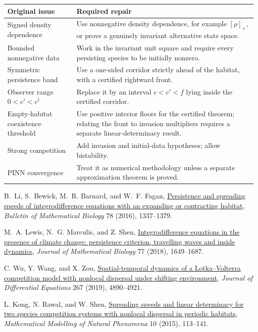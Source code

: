 \documentclass[11pt]{article}
\theoremstyle{definition}
\begin{document}
\begin{center}
\begin{tabularx}{0.92\textwidth}{@{}>{\raggedright\arraybackslash}p{}Y@{}}
\toprule
Original issue & Required repair\\
\midrule
Signed density dependence &
Use nonnegative density dependence, for example
\([\rho]_+\), or prove a genuinely invariant alternative state space.\\
Bounded nonnegative data &
Work in the invariant unit square and require every persisting species to be
initially nonzero.\\
Symmetric persistence band &
Use a one-sided corridor strictly ahead of the habitat, with a certified
rightward front.\\
Observer range \(0<c'<c^\dagger\) &
Replace it by an interval \(c<c'<f\) lying inside the certified corridor.\\
Empty-habitat coexistence threshold &
Use positive interior floors for the certified theorem; relating the front
to invasion multipliers requires a separate linear-determinacy result.\\
Strong competition &
Add invasion and initial-data hypotheses; allow bistability.\\
PINN convergence &
Treat it as numerical methodology unless a separate approximation theorem is
proved.\\
\bottomrule
\end{tabularx}
\end{center}

\begin{thebibliography}{9}

B.~Li, S.~Bewick, M.~R. Barnard, and W.~F. Fagan,
\href{https://doi.org/10.1007/s11538-016-0180-2}
{Persistence and spreading speeds of integrodifference equations with an
expanding or contracting habitat},
\emph{Bulletin of Mathematical Biology} 78 (2016), 1337--1379.

M.~A. Lewis, N.~G. Marculis, and Z. Shen,
\href{https://www.math.ualberta.ca/~mlewis/Publications%202018/Lewis_Marculis_Shen.pdf}
{Integrodifference equations in the presence of climate change:
persistence criterion, travelling waves and inside dynamics},
\emph{Journal of Mathematical Biology} 77 (2018), 1649--1687.

C. Wu, Y. Wang, and X. Zou,
\href{https://www.uwo.ca/apmaths/faculty/zou/repr/jde19-2.pdf}
{Spatial-temporal dynamics of a Lotka--Volterra competition model with
nonlocal dispersal under shifting environment},
\emph{Journal of Differential Equations} 267 (2019), 4890--4921.

L. Kong, N. Rawal, and W. Shen,
\href{https://arxiv.org/abs/1410.0317}
{Spreading speeds and linear determinacy for two species competition
systems with nonlocal dispersal in periodic habitats},
\emph{Mathematical Modelling of Natural Phenomena} 10 (2015), 113--141.

\end{thebibliography}
\end{document}
